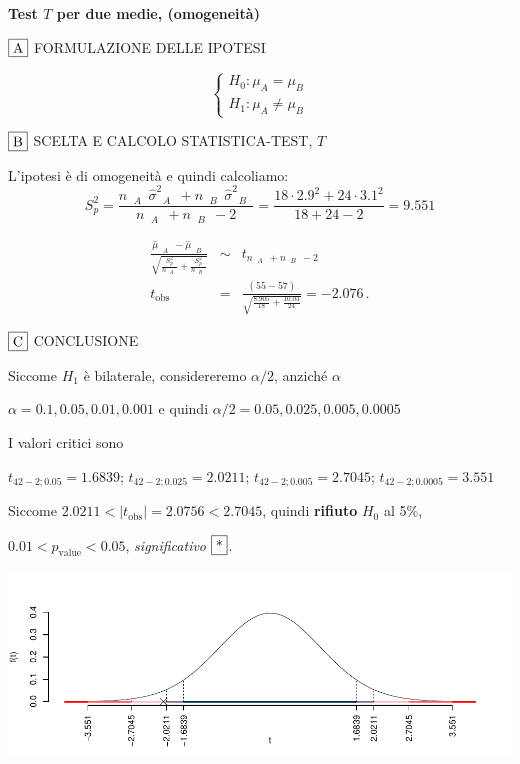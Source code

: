 \documentclass[
  11pt,
]{book}
\theoremstyle{mytheoremstyle}
\theoremstyle{mydefstyle}
\begin{document}
\textbf{Test \(T\) per due medie, (omogeneità)}

\(\fbox{A}\) FORMULAZIONE DELLE IPOTESI

\[\begin{cases}
   H_0: \mu_\text{$A$} = \mu_\text{$B$} \\
   H_1: \mu_\text{$A$} \neq \mu_\text{$B$} 
   \end{cases}\]

\(\fbox{B}\) SCELTA E CALCOLO STATISTICA-TEST, \(T\)

L'ipotesi è di omogeneità e quindi calcoliamo:\[
   S_p^2=\frac{n_\text{ $A$ }\hat\sigma^2_\text{ $A$ }+n_\text{ $B$ }\hat\sigma^2_\text{ $B$ }}{n_\text{ $A$ }+n_\text{ $B$ }-2} =
   \frac{ 18 \cdot 2.9 ^2+ 24 \cdot 3.1 ^2}{ 18 + 24 -2}= 9.551 
  \]

\begin{eqnarray*}
  \frac{\hat\mu_\text{ $A$ } - \hat\mu_\text{ $B$ }}
  {\sqrt{\frac {S^2_p}{n_\text{ $A$ }}+\frac {S^2_p}{n_\text{ $B$ }}}}&\sim&t_{n_\text{ $A$ }+n_\text{ $B$ }-2}\\
  t_{\text{obs}}
  &=& \frac{ ( 55 -  57 )} {\sqrt{\frac{ 8.905 }{ 18 }+\frac{ 10.03 }{ 24 }}}
  =   -2.076 \, .
  \end{eqnarray*}

\(\fbox{C}\) CONCLUSIONE

Siccome \(H_1\) è bilaterale, considereremo \(\alpha/2\),
anziché \(\alpha\)

\(\alpha=0.1, 0.05, 0.01, 0.001\) e quindi \(\alpha/2=0.05, 0.025, 0.005, 0.0005\)

I valori critici sono

\(t_{42-2;0.05}=1.6839\); \(t_{42-2;0.025}=2.0211\); \(t_{42-2;0.005}=2.7045\); \(t_{42-2;0.0005}=3.551\)

Siccome \(2.0211<|t_\text{obs}|=2.0756<2.7045\), quindi \textbf{rifiuto} \(H_0\) al 5\%,

\(0.01<p_\text{value}<0.05\), \emph{significativo} \(\fbox{*}\).

\begin{center}\includegraphics{Appunti_di_Statistica_2025_files/figure-latex/16-test-2C-2-1} \end{center}
\end{document}

